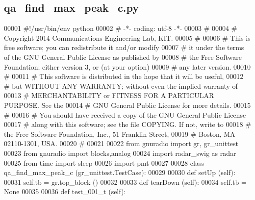 \subsection{qa\+\_\+find\+\_\+max\+\_\+peak\+\_\+c.\+py}
\label{qa__find__max__peak__c_8py_source}

\begin{DoxyCode}
00001 \textcolor{comment}{#!/usr/bin/env python}
00002 \textcolor{comment}{# -*- coding: utf-8 -*-}
00003 \textcolor{comment}{# }
00004 \textcolor{comment}{# Copyright 2014 Communications Engineering Lab, KIT.}
00005 \textcolor{comment}{# }
00006 \textcolor{comment}{# This is free software; you can redistribute it and/or modify}
00007 \textcolor{comment}{# it under the terms of the GNU General Public License as published by}
00008 \textcolor{comment}{# the Free Software Foundation; either version 3, or (at your option)}
00009 \textcolor{comment}{# any later version.}
00010 \textcolor{comment}{# }
00011 \textcolor{comment}{# This software is distributed in the hope that it will be useful,}
00012 \textcolor{comment}{# but WITHOUT ANY WARRANTY; without even the implied warranty of}
00013 \textcolor{comment}{# MERCHANTABILITY or FITNESS FOR A PARTICULAR PURPOSE.  See the}
00014 \textcolor{comment}{# GNU General Public License for more details.}
00015 \textcolor{comment}{# }
00016 \textcolor{comment}{# You should have received a copy of the GNU General Public License}
00017 \textcolor{comment}{# along with this software; see the file COPYING.  If not, write to}
00018 \textcolor{comment}{# the Free Software Foundation, Inc., 51 Franklin Street,}
00019 \textcolor{comment}{# Boston, MA 02110-1301, USA.}
00020 \textcolor{comment}{# }
00021 
00022 \textcolor{keyword}{from} gnuradio \textcolor{keyword}{import} gr, gr\_unittest
00023 \textcolor{keyword}{from} gnuradio \textcolor{keyword}{import} blocks,analog
00024 \textcolor{keyword}{import} radar\_swig \textcolor{keyword}{as} radar
00025 \textcolor{keyword}{from} time \textcolor{keyword}{import} sleep
00026 \textcolor{keyword}{import} pmt
00027 
00028 \textcolor{keyword}{class }qa_find_max_peak_c (gr\_unittest.TestCase):
00029 
00030     \textcolor{keyword}{def }setUp (self):
00031         self.tb = gr.top\_block ()
00032 
00033     \textcolor{keyword}{def }tearDown (self):
00034         self.tb = \textcolor{keywordtype}{None}
00035 
00036     \textcolor{keyword}{def }test_001_t (self):

\end{DoxyCode}

